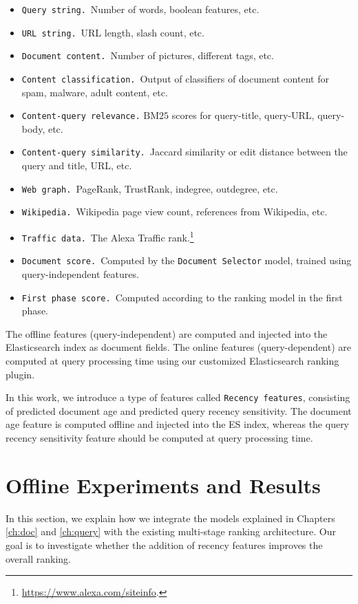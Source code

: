 \begin{itemize}
	\item \texttt{Query string.}\ Number of words, boolean features, etc.
    \item \texttt{URL string.}\ URL length, slash count, etc.
    \item \texttt{Document content.}\ Number of pictures, different tags, etc.
    \item \texttt{Content classification.}\ Output of classifiers of document content for spam, malware, adult content, etc.
    \item \texttt{Content-query relevance.} $\text{BM}25$ scores for query-title, query-URL, query-body, etc.
    \item \texttt{Content-query similarity.}\ Jaccard similarity or edit distance between the query and title, URL, etc.
    \item \texttt{Web graph.}\ PageRank, TrustRank, indegree, outdegree, etc.
    \item \texttt{Wikipedia.}\ Wikipedia page view count, references from Wikipedia, etc.
    \item \texttt{Traffic data.}\ The Alexa Traffic rank.\footnote{\url{https://www.alexa.com/siteinfo}.}
    \item \texttt{Document score.}\ Computed by the \texttt{Document Selector} model, trained using query-independent features.
    \item \texttt{First phase score.}\ Computed according to the ranking model in the first phase.
\end{itemize}

The offline features (query-independent) are computed and injected into the Elasticsearch index as document fields. The online features (query-dependent) are computed at query processing time using our customized Elasticsearch ranking plugin.

In this work, we introduce a type of features called \texttt{Recency features}, consisting of predicted document age and predicted query recency sensitivity. The document age feature is computed offline and injected into the ES index, whereas the query recency sensitivity feature should be computed at query processing time.

\section{Offline Experiments and Results}
In this section, we explain how we integrate the models explained in Chapters \ref{ch:doc} and \ref{ch:query} with the existing multi-stage ranking architecture. Our goal is to investigate whether the addition of recency features improves the overall ranking.

